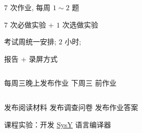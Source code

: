 \begin{frame}{}
  \begin{columns}
      \begin{description}[<+->]
        \setlength{\itemsep}{25pt}
        \item[\cyan{\bf 平时作业 ($00$ 分):}] $7$ 次作业, 每周 $1 \sim 2$ 题
        \item[\red{\bf 课程实验 ($60$ 分):}] $7$ 次必做实验 + $1$ 次选做实验 
        \item[\red{\bf 期末测试 ($40$ 分):}] 考试周统一安排; $2$ 小时; 
        \item[\teal{\bf 附加作业 ($05$ 分):}] 报告 + 录屏方式
      \end{description}
  \end{columns}
\end{frame}

\begin{frame}{}
  \begin{center}
    每周三晚上发布作业 \qquad 下周三  前作业
  \end{center}

  \begin{columns}
    \vspace{-0.80cm}
    \begin{center}
    \end{center}
  \end{columns}

  \vspace{0.30cm}
  \begin{center}
    发布阅读材料 \qquad 发布调查问卷 \qquad 发布作业答案
  \end{center}
\end{frame}

\begin{frame}{}
  \begin{center}
    课程实验：开发 \href{https://compiler.educg.net/}{\textsf{SysY}} 语言编译器


    \vspace{0.30cm}
  \end{center}
\end{frame}

